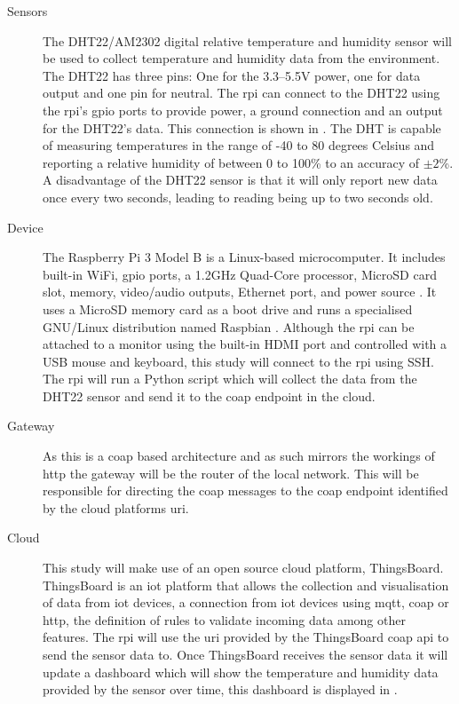\begin{description}
    \item[Sensors] 
    The DHT22/AM2302 digital relative temperature and humidity 
    sensor will be used to collect temperature and humidity data from the environment.
    The DHT22 has three pins: One for the 3.3--5.5V power, one for data output and
    one pin for neutral. The \gls{rpi} can connect to the DHT22 using the \gls{rpi}'s 
    \gls{gpio} ports to provide power, a ground connection and an output for the 
    DHT22's data. This connection is shown in . The DHT 
    is capable of measuring temperatures in the range of -40 to 80 degrees Celsius
    and reporting a relative humidity of between 0 to 100\% to an accuracy of $\pm2$\%.
    A disadvantage of the DHT22 sensor is that it will only report new data
    once every two seconds, leading to reading being up to two seconds old.

    \item[Device]
    The Raspberry Pi 3 Model B is a Linux-based microcomputer.
    It includes built-in WiFi, \gls{gpio} ports, a 1.2GHz Quad-Core processor,
    MicroSD card slot, memory, video/audio outputs, Ethernet port, and power source 
    \citep{pi_model_2018}. 
    It uses a MicroSD memory card as a boot drive and runs a specialised 
    GNU/Linux distribution named Raspbian \citep{raspbian_raspbian_2018}. Although the \gls{rpi} can be attached
    to a monitor using the built-in HDMI port and controlled with a USB mouse and
    keyboard, this study will connect to the \gls{rpi} using SSH. The \gls{rpi} 
    will run a Python script which will collect the data from the DHT22 sensor 
    and send it to the \gls{coap} endpoint in the cloud.

    \item[Gateway]
    As this is a \gls{coap} based architecture and as such mirrors the workings
    of \gls{http} the gateway will be the router of the local network. This will be 
    responsible for directing the \gls{coap} messages to the \gls{coap} endpoint
    identified by the cloud platforms \gls{uri}.

    \item[Cloud]
    This study will make use of an open source cloud platform, ThingsBoard.
    ThingsBoard is an \gls{iot} platform that allows the collection and 
    visualisation of data from \gls{iot} devices, a connection from \gls{iot} devices
    using \gls{mqtt}, \gls{coap} or \gls{http}, the definition of rules to validate
    incoming data among other features. The \gls{rpi} will use the \gls{uri} 
    provided by the ThingsBoard \gls{coap} \gls{api} to send the sensor data to.
    Once ThingsBoard receives the sensor data it will update a dashboard which
    will show the temperature and humidity data provided by the sensor over time,
    this dashboard is displayed in .

\end{description}

